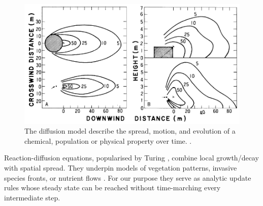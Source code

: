 \begin{figure}[H]
    \centering
    \includegraphics[width= .8 \linewidth]{diffusion-example-Okubo2001.png}
    \caption{The diffusion model describe the spread, motion, and evolution of a chemical, population or physical property over time. \cite{Okubo2001}.}
    \label{fig:diffusion-model-teaser}    
\end{figure}

Reaction-diffusion equations, popularised by Turing \cite{Turing1952}, combine local growth/decay with spatial spread. They underpin models of vegetation patterns, invasive species fronts, or nutrient flows \cite{Cosner2008}. For our purpose they serve as analytic update rules whose steady state can be reached without time-marching every intermediate step.




